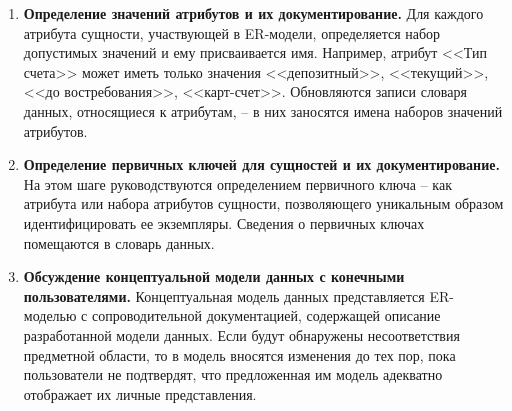 \begin{enumerate}
\begin{itemize}
		\item тип и размерность значений;
		
		\item значение, принимаемое для атрибута по умолчанию (если такое имеется);
		
		\item может ли атрибут иметь NULL-значения;
		
		\item является ли атрибут составным, и если это так, то из каких простых атрибутов он состоит.
		Например, атрибут <<Ф.И.О. клиента>> может состоять из простых атрибутов <<Фамилия>>, <<Имя>>,
		<<Отчество>>, а может быть простым, содержащим единые значения, как-то <<Сидорский Евгений
		Михайлович>>. Если пользователь не нуждается в доступе к отдельным элементам <<Ф.И.О.>>,
		то атрибут представляется как простой;
		
		\item является ли атрибут расчетным, и если это так, то как вычисляются его значения.
	\end{itemize}
	
	\item \textbf{Определение значений атрибутов и их документирование.}
	Для каждого атрибута сущности, участвующей в ER-модели, определяется набор допустимых значений и ему
	присваивается имя. Например, атрибут <<Тип счета>> может иметь только значения <<депозитный>>, <<текущий>>,
	<<до востребования>>, <<карт-счет>>. Обновляются записи словаря данных, относящиеся к атрибутам, – в них
	заносятся имена наборов значений атрибутов.
	
	\item \textbf{Определение первичных ключей для сущностей и их документирование.}
	На этом шаге руководствуются определением первичного ключа – как атрибута или набора атрибутов сущности,
	позволяющего уникальным образом идентифицировать ее экземпляры. Сведения о первичных ключах помещаются
	в словарь данных.
	
	\item \textbf{Обсуждение концептуальной модели данных с конечными пользователями.}
	Концептуальная модель данных представляется ER-моделью с сопроводительной документацией, содержащей
	описание разработанной модели данных. Если будут обнаружены несоответствия предметной области, то в
	модель вносятся изменения  до тех пор, пока пользователи не подтвердят, что предложенная им модель
	адекватно отображает их личные представления.
\end{enumerate}

